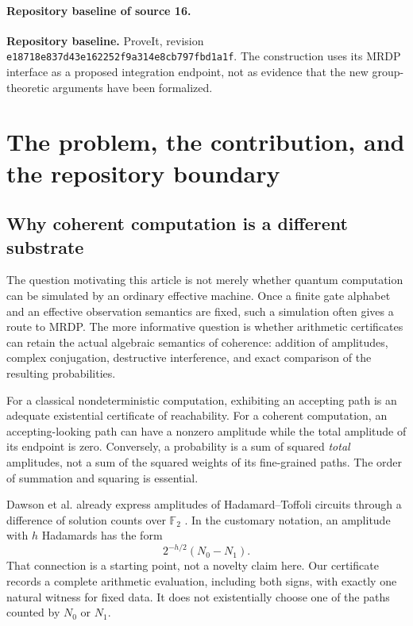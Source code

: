 \documentclass[11pt,letterpaper]{article}
\numberwithin{equation}{section}
\theoremstyle{definition}
\theoremstyle{remark}
\newcommand{\code}[1]{\nolinkurl{#1}}
\newcommand{\srcmark}[1]{\par\noindent{\small\itshape [source~#1]}\par}
\begin{document}
\paragraph{Repository baseline of source 16.}
\noindent\textbf{Repository baseline.} ProveIt, revision
\code{e18718e837d43e162252f9a314e8cb797fbd1a1f}.
The construction uses its MRDP interface as a proposed integration endpoint,
not as evidence that the new group-theoretic arguments have been formalized.

\section{The problem, the contribution, and the repository boundary}
\label{pqc:cc:sec:introduction}
\srcmark{10}

\subsection{Why coherent computation is a different substrate}

The question motivating this article is not merely whether quantum computation
can be simulated by an ordinary effective machine. Once a finite gate alphabet
and an effective observation semantics are fixed, such a simulation often gives
a route to MRDP. The more informative question is whether arithmetic certificates
can retain the actual algebraic semantics of coherence: addition of amplitudes,
complex conjugation, destructive interference, and exact comparison of the
resulting probabilities.

For a classical nondeterministic computation, exhibiting an accepting path is
an adequate existential certificate of reachability. For a coherent computation,
an accepting-looking path can have a nonzero amplitude while the total amplitude
of its endpoint is zero. Conversely, a probability is a sum of squared
\emph{total} amplitudes, not a sum of the squared weights of its fine-grained
paths. The order of summation and squaring is essential.

Dawson et al. already express amplitudes of Hadamard--Toffoli circuits through a
difference of solution counts over $\mathbb F_2$ \cite{b62s10-Dawson}. In the customary
notation, an amplitude with $h$ Hadamards has the form
\begin{equation}
2^{-h/2}(N_0-N_1).
\label{pqc:cc:eq:pathgap}
\end{equation}
That connection is a starting point, not a novelty claim here. Our certificate
records a complete arithmetic evaluation, including both signs, with exactly one
natural witness for fixed data. It does not existentially choose one of the
paths counted by $N_0$ or $N_1$.
\end{document}

